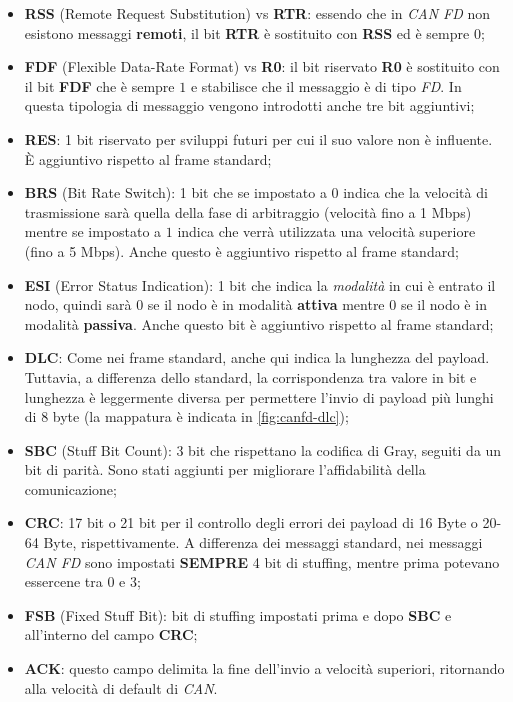\begin{itemize}
    \item \textbf{RSS} (Remote Request Substitution) vs \textbf{RTR}: essendo che in \emph{CAN FD} non esistono messaggi \textbf{remoti}, il bit \textbf{RTR} è sostituito con \textbf{RSS} ed è sempre $0$; 
    \item \textbf{FDF} (Flexible Data-Rate Format) vs \textbf{R0}: il bit riservato \textbf{R0} è sostituito con il bit \textbf{FDF} che è sempre $1$ e stabilisce che il messaggio è di tipo \emph{FD}. In questa tipologia di messaggio vengono introdotti anche tre bit aggiuntivi;
    \item \textbf{RES}: 1 bit riservato per sviluppi futuri per cui il suo valore non è influente. È aggiuntivo rispetto al frame standard;
    \item \textbf{BRS} (Bit Rate Switch): 1 bit che se impostato a $0$ indica che la velocità di trasmissione sarà quella della fase di arbitraggio (velocità fino a 1 Mbps) mentre se impostato a $1$ indica che verrà utilizzata una velocità superiore (fino a 5 Mbps). Anche questo è aggiuntivo rispetto al frame standard;
    \item \textbf{ESI} (Error Status Indication): 1 bit che indica la \emph{modalità} in cui è entrato il nodo, quindi sarà $0$ se il nodo è in modalità \textbf{attiva} mentre $0$ se il nodo è in modalità \textbf{passiva}. Anche questo bit è aggiuntivo rispetto al frame standard;
    \item \textbf{DLC}: Come nei frame standard, anche qui indica la lunghezza del payload. Tuttavia, a differenza dello standard, la corrispondenza tra valore in bit e lunghezza è leggermente diversa per permettere l'invio di payload più lunghi di 8 byte (la mappatura è indicata in \autoref{fig:canfd-dlc});
    \item \textbf{SBC} (Stuff Bit Count): 3 bit che rispettano la codifica di Gray, seguiti da un bit di parità. Sono stati aggiunti per migliorare l'affidabilità della comunicazione;
    \item \textbf{CRC}: 17 bit o 21 bit per il controllo degli errori dei payload di 16 Byte o 20-64 Byte, rispettivamente. A differenza dei messaggi standard, nei messaggi \emph{CAN FD} sono impostati \textbf{SEMPRE} 4 bit di stuffing, mentre prima potevano essercene tra 0 e 3;
    \item \textbf{FSB} (Fixed Stuff Bit): bit di stuffing impostati prima e dopo \textbf{SBC} e all'interno del campo \textbf{CRC};
    \item \textbf{ACK}: questo campo delimita la fine dell'invio a velocità superiori, ritornando alla velocità di default di \emph{CAN}.
\end{itemize}

